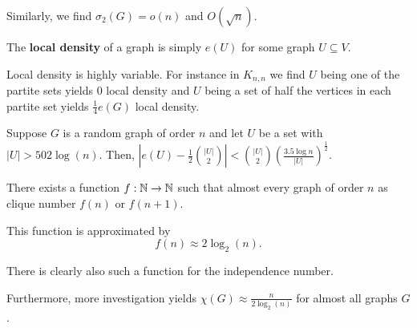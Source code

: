 Similarly, we find \(\sigma_2\left( G  \right) = o\left( n \right) \) and \(O\left( \sqrt{n}  \right) \).
\begin{definition}
	The \textbf{local density} of a graph is simply \(e\left( U \right) \) for some graph \(U \subseteq V\).
\end{definition}
\begin{remark}
	Local density is highly variable. For instance in \(K_{n, n} \) we find \(U\) being one of the partite sets yields \(0\) local density and \(U\) being a set of half the vertices in each partite set yields \(\frac{1}{4}e\left( G \right) \) local density.
\end{remark}

\begin{proposition}
	Suppose \(G\) is a random graph of order \(n\) and let \(U\) be a set with \(\left| U \right| > 502 \log \left( n \right) \). Then, \(\left| e\left( U \right) - \frac{1}{2}\binom{\left| U \right| }{2} \right|  < \binom{\left| U \right| }{2} \left( \frac{3.5 \log n}{\left| U \right| } \right) ^{\frac{1}{2}}\). \\
\end{proposition}
\begin{proposition}
	There exists a function \(f: \mathbb{N} \to \mathbb{N}\) such that almost every graph of order \(n\) as clique number \(f\left( n \right) \) or \(f\left( n+1 \right) \).
\end{proposition}
This function is approximated by \[
	f\left( n \right)  \approx 2 \log_2\left( n \right)
.\]
\begin{remark}
	There is  clearly also such a function for the independence number.
\end{remark}
Furthermore, more investigation yields \(\chi \left( G \right)  \approx \frac{n}{2 \log_2\left( n \right) } \) for almost all graphs \(G\).
